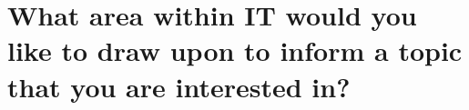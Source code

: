 \section{What area within IT would you like to draw upon to inform a topic that you are interested in?}
